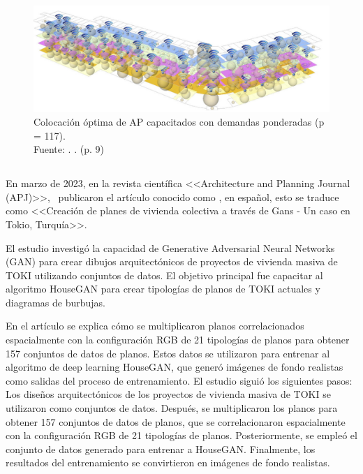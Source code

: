 \begin{figure}[!ht]
	\begin{center}
		\includegraphics[width=1\textwidth]{2/figures/lee2015.png}
		\caption[Colocación óptima de AP capacitados con demandas ponderadas (p = 117)]{Colocación óptima de AP capacitados con demandas ponderadas (p = 117).\\
		Fuente: \cite{pr_lee2015coverage3d}. . (p. 9)}
		\label{2:fig119}
	\end{center}
\end{figure}

\subsection{}
En marzo de 2023, en la revista científica <<Architecture and Planning Journal (APJ)>>, \cite{pr_ozerol2023genermass} publicaron el artículo conocido como , en español, esto se traduce como <<Creación de planes de vivienda colectiva a través de Gans - Un caso en Tokio, Turquía>>.

El estudio investigó la capacidad de Generative Adversarial Neural Networks (GAN) para crear dibujos arquitectónicos de proyectos de vivienda masiva de TOKI utilizando conjuntos de datos. El objetivo principal fue capacitar al algoritmo HouseGAN para crear tipologías de planos de TOKI actuales y diagramas de burbujas.

En el artículo se explica cómo se multiplicaron planos correlacionados espacialmente con la configuración RGB de 21 tipologías de planos para obtener 157 conjuntos de datos de planos. Estos datos se utilizaron para entrenar al algoritmo de deep learning HouseGAN, que generó imágenes de fondo realistas como salidas del proceso de entrenamiento. El estudio siguió los siguientes pasos: Los diseños arquitectónicos de los proyectos de vivienda masiva de TOKI se utilizaron como conjuntos de datos. Después, se multiplicaron los planos para obtener 157 conjuntos de datos de planos, que se correlacionaron espacialmente con la configuración RGB de 21 tipologías de planos. Posteriormente, se empleó el conjunto de datos generado para entrenar a HouseGAN. Finalmente, los resultados del entrenamiento se convirtieron en imágenes de fondo realistas.

